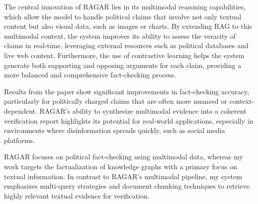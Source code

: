 The central innovation of RAGAR lies in its multimodal reasoning capabilities, which allow the model to handle political claims that involve not only textual content but also visual data, such as images or charts.
By extending RAG to this multimodal context, the system improves its ability to assess the veracity of claims in real-time, leveraging external resources such as political databases and live web content.
Furthermore, the use of contrastive learning helps the system generate both supporting and opposing arguments for each claim, providing a more balanced and comprehensive fact-checking process.

Results from the paper show significant improvements in fact-checking accuracy, particularly for politically charged claims that are often more nuanced or context-dependent.
RAGAR's ability to synthesize multimodal evidence into a coherent verification report highlights its potential for real-world applications, especially in environments where disinformation spreads quickly, such as social media platforms.

RAGAR focuses on political fact-checking using multimodal data, whereas my work targets the factualization of knowledge graphs with a primary focus on textual information.
In contrast to RAGAR’s multimodal pipeline, my system emphasizes multi-query strategies and document chunking techniques to retrieve highly relevant textual evidence for verification.

